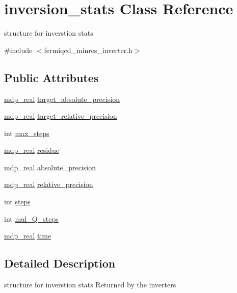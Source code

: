 \hypertarget{classinversion__stats}{
\section{inversion\_\-stats Class Reference}
\label{classinversion__stats}
}


structure for inverstion stats  


{\ttfamily \#include $<$fermiqcd\_\-minres\_\-inverter.h$>$}\subsection*{Public Attributes}
\begin{DoxyCompactItemize}
\item 
\hyperlink{mdp__global__vars_8h_a049e4c1d4e74d644878a42f9909463e4}{mdp\_\-real} \hyperlink{classinversion__stats_aa3e398f27da37c39f825b407829e8c15}{target\_\-absolute\_\-precision}
\item 
\hyperlink{mdp__global__vars_8h_a049e4c1d4e74d644878a42f9909463e4}{mdp\_\-real} \hyperlink{classinversion__stats_a57f0e5274f6057d41a9e386d2d3d213e}{target\_\-relative\_\-precision}
\item 
int \hyperlink{classinversion__stats_ad11085b60e91bb439a125457fc16c69a}{max\_\-steps}
\item 
\hyperlink{mdp__global__vars_8h_a049e4c1d4e74d644878a42f9909463e4}{mdp\_\-real} \hyperlink{classinversion__stats_a6463ea546805e548502803d09c7b74f0}{residue}
\item 
\hyperlink{mdp__global__vars_8h_a049e4c1d4e74d644878a42f9909463e4}{mdp\_\-real} \hyperlink{classinversion__stats_aba965f93a417bb48f9d01933cbacc46e}{absolute\_\-precision}
\item 
\hyperlink{mdp__global__vars_8h_a049e4c1d4e74d644878a42f9909463e4}{mdp\_\-real} \hyperlink{classinversion__stats_a3bbfed38efd2f5669aaee413676f0d4a}{relative\_\-precision}
\item 
int \hyperlink{classinversion__stats_aabd17c3bb1476dc06843ed171ea53253}{steps}
\item 
int \hyperlink{classinversion__stats_a392e51a8f0ced3098ce309018dfa932c}{mul\_\-Q\_\-steps}
\item 
\hyperlink{mdp__global__vars_8h_a049e4c1d4e74d644878a42f9909463e4}{mdp\_\-real} \hyperlink{classinversion__stats_a648a0c2aae15866e7331d0cd4d0736ff}{time}
\end{DoxyCompactItemize}


\subsection{Detailed Description}
structure for inverstion stats Returned by the inverters 

